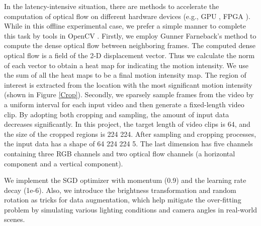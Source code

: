 \documentclass[a4paper,conference]{IEEEtran}
\begin{document}
In the latency-intensive situation, there are methods to accelerate the computation of optical flow on different hardware devices (e.g., GPU \cite{gpu_based_opt_2}, FPGA \cite{gpu_based_opt_1}). While in this offline experimental case, we prefer a simple manner to complete this task by tools in OpenCV \cite{opencv}. Firstly, we employ Gunner Farneback's method \cite{optflow} to compute the dense optical flow between neighboring frames. The computed dense optical flow is a field of the 2-D displacement vector. Thus we calculate the norm of each vector to obtain a heat map for indicating the motion intensity. We use the sum of all the heat maps to be a final motion intensity map. The region of interest is extracted from the location with the most significant motion intensity (shown in Figure \ref{Crop}). Secondly, we sparsely sample frames from the video by a uniform interval for each input video and then generate a fixed-length video clip. By adopting both cropping and sampling, the amount of input data decreases significantly. In this project, the target length of video clips is 64, and the size of the cropped regions is 224  224. After sampling and cropping processes, the input data has a shape of 64  224  224  5. The last dimension has five channels containing three RGB channels and two optical flow channels (a horizontal component and a vertical component).

We implement the SGD optimizer with momentum (0.9) and the learning rate decay (1e-6). Also, we introduce the brightness transformation and random rotation as tricks for data augmentation, which help mitigate the over-fitting problem by simulating various lighting conditions and camera angles in real-world scenes. 
\end{document}
